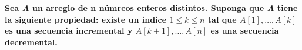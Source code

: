 \textbf{Sea \textit{A} un arreglo de n númreos enteros distintos. Suponga
que \textit{A} tiene la siguiente propiedad: existe un indice $1 \leq k \leq
n$ tal que $A[1],\dots,A[k]$ es una secuencia incremental y $A[k+1],\dots,
A[n]$ es una secuencia decremental.}\\